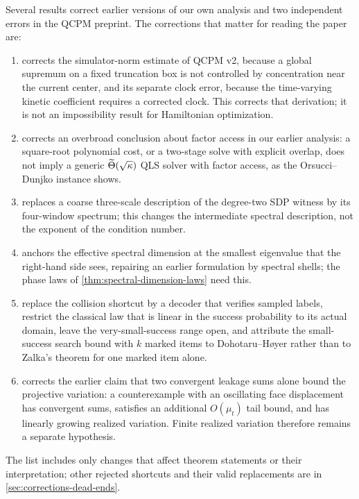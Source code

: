 Several results correct earlier versions of our own analysis and two
independent errors in the QCPM preprint.  The corrections that matter for
reading the paper are:
\begin{enumerate}[leftmargin=*]
 \item {} corrects the simulator-norm estimate of
 QCPM v2, because a global supremum on a fixed truncation box is not
 controlled by concentration near the current center, and its separate clock
 error, because the time-varying kinetic coefficient requires a corrected
 clock.  This corrects that derivation; it is not an impossibility result
 for Hamiltonian optimization.
 \item {} corrects an overbroad conclusion about
 factor access in our earlier analysis: a square-root polynomial cost, or a
 two-stage solve with explicit overlap, does not imply a generic
 \(\widetilde{\Theta}(\sqrt\kappa)\) QLS solver with factor access, as the
 Orsucci--Dunjko instance shows.
 \item {} replaces a coarse three-scale
 description of the degree-two SDP witness by its four-window spectrum; this
 changes the intermediate spectral description, not the exponent of the
 condition number.
 \item {} anchors the effective spectral
 dimension at the smallest eigenvalue that the right-hand side sees,
 repairing an earlier formulation by spectral shells; the phase laws of
 \cref{thm:spectral-dimension-laws} need this.
 \item
 replace the collision shortcut by a decoder that verifies sampled labels,
 restrict the classical law that is linear in the success probability to its
 actual domain, leave the very-small-success range open, and attribute the
 small-success search bound with \(k\) marked items to Dohotaru--H\o yer
 rather than to Zalka's theorem for one marked item alone.
 \item {} corrects the earlier claim that two
 convergent leakage sums alone bound the projective variation: a
 counterexample with an oscillating face displacement has convergent sums,
 satisfies an additional $O(\mu_t)$ tail bound, and has linearly growing
 realized variation.  Finite realized variation therefore remains a separate
 hypothesis.
\end{enumerate}
The list includes only changes that affect theorem statements or their
interpretation; other rejected shortcuts and their valid replacements are in
\cref{sec:corrections-dead-ends}.

